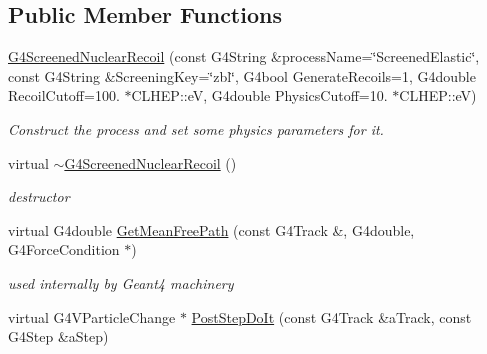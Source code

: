 \subsection*{Public Member Functions}
\begin{DoxyCompactItemize}
\item 
\hyperlink{classG4ScreenedNuclearRecoil_aef8f67b31b487b3fff30f773b9ad6a65}{G4\-Screened\-Nuclear\-Recoil} (const G4\-String \&process\-Name=\char`\"{}Screened\-Elastic\char`\"{}, const G4\-String \&Screening\-Key=\char`\"{}zbl\char`\"{}, G4bool Generate\-Recoils=1, G4double Recoil\-Cutoff=100. $\ast$C\-L\-H\-E\-P\-::e\-V, G4double Physics\-Cutoff=10. $\ast$C\-L\-H\-E\-P\-::e\-V)
\begin{DoxyCompactList}\small\item\em Construct the process and set some physics parameters for it. \end{DoxyCompactList}\item 
\hypertarget{classG4ScreenedNuclearRecoil_ab0abe5d31e651ae07660f01dbeb4981f}{virtual \hyperlink{classG4ScreenedNuclearRecoil_ab0abe5d31e651ae07660f01dbeb4981f}{$\sim$\-G4\-Screened\-Nuclear\-Recoil} ()}\label{classG4ScreenedNuclearRecoil_ab0abe5d31e651ae07660f01dbeb4981f}

\begin{DoxyCompactList}\small\item\em destructor \end{DoxyCompactList}\item 
\hypertarget{classG4ScreenedNuclearRecoil_ab00d6e1a7592a577e9c10ca4c62375ae}{virtual G4double \hyperlink{classG4ScreenedNuclearRecoil_ab00d6e1a7592a577e9c10ca4c62375ae}{Get\-Mean\-Free\-Path} (const G4\-Track \&, G4double, G4\-Force\-Condition $\ast$)}\label{classG4ScreenedNuclearRecoil_ab00d6e1a7592a577e9c10ca4c62375ae}

\begin{DoxyCompactList}\small\item\em used internally by Geant4 machinery \end{DoxyCompactList}\item 
\hypertarget{classG4ScreenedNuclearRecoil_afd0ebeb0fa559a64263c27d7d9912919}{virtual G4\-V\-Particle\-Change $\ast$ \hyperlink{classG4ScreenedNuclearRecoil_afd0ebeb0fa559a64263c27d7d9912919}{Post\-Step\-Do\-It} (const G4\-Track \&a\-Track, const G4\-Step \&a\-Step)}\label{classG4ScreenedNuclearRecoil_afd0ebeb0fa559a64263c27d7d9912919}


\end{DoxyCompactItemize}
